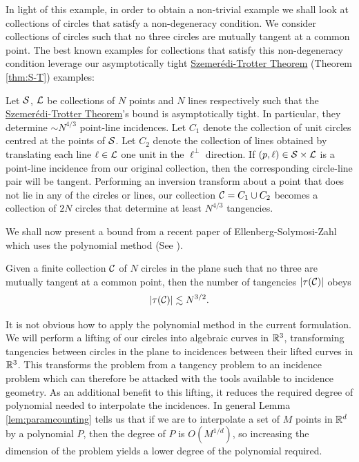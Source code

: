 In light of this example, in order to obtain a non-trivial example we shall look at collections of circles that satisfy a non-degeneracy condition. We consider collections of circles 
such that no three circles are mutually tangent at a common point. The best known examples for collections that satisfy this non-degeneracy condition leverage our asymptotically tight \hyperref[thm:S-T]{Szemerédi-Trotter Theorem} (Theorem \ref{thm:S-T}) examples:
\begin{example}
    Let $\mathcal S$, $\mathcal L$ be collections of $N$ points and $N$ lines respectively such that the \hyperref[thm:S-T]{Szemerédi-Trotter Theorem}'s bound is asymptotically tight. 
    In particular, they determine $\sim N^{4/3}$ point-line incidences. 
    Let $C_1$ denote the collection of unit circles centred at the points of $\mathcal S$. 
    Let $C_2$ denote the collection of lines obtained by translating each line $\ell \in \mathcal L$ one unit in the $\ell^{\perp}$ direction.
    If $(p,\ell) \in \mathcal S \times \mathcal L$ is a point-line incidence from our original collection, then the corresponding circle-line pair will be tangent.
    Performing an inversion transform about a point that does not lie in any of the circles or lines, our collection $\mathcal C = C_1 \cup C_2$ becomes a 
    collection of $2N$ circles that determine at least $N^{4/3}$ tangencies. \label{ex:circle-lower-bound}
 \end{example}

We shall now present a bound from a recent paper of Ellenberg-Solymosi-Zahl which uses the polynomial method (See \cite{ellenberg2016new}).

\begin{theorem}
    Given a finite collection $\mathcal C$ of $N$ circles in the plane such that no three are mutually tangent at a common point, 
    then the number of tangencies $|\tau(\mathcal C)|$ obeys   \label{thm:circle-tangencies}
    \[
        |\tau(\mathcal C)| \lesssim N^{3/2}.
    \]
\end{theorem}

It is not obvious how to apply the polynomial method in the current formulation. 
We will perform a lifting  of our circles into algebraic curves in $\mathbb R^3$, 
transforming tangencies between circles in the plane to incidences between their lifted curves in $\mathbb R^3$. 
This transforms the problem from a tangency problem to an incidence problem which can therefore be attacked with the tools available to incidence geometry. As an additional benefit to this lifting, it reduces the required degree of polynomial needed to interpolate the incidences.
In general Lemma \ref{lem:paramcounting} tells us that if we are to interpolate a set of $M$ points in $\mathbb R^d$ by a polynomial $P$, then the degree of $P$ is $O(M^{1/d})$, 
so increasing the dimension of the problem yields a lower degree of the polynomial required.

